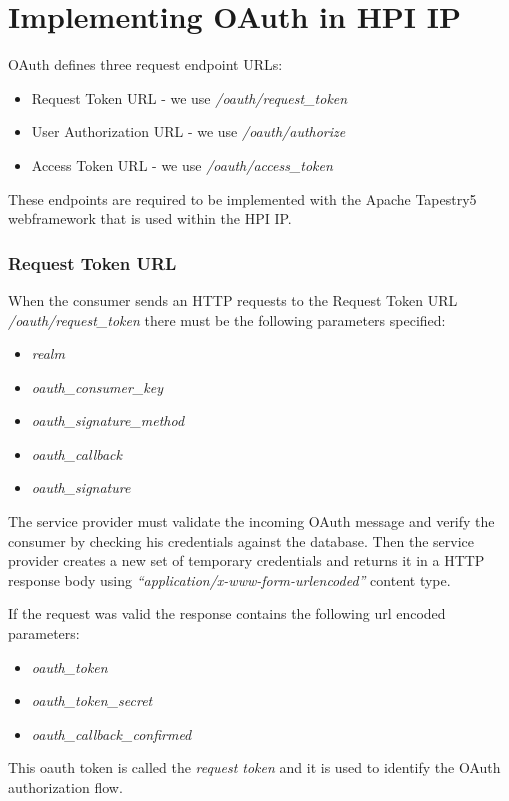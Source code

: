 \section{Implementing OAuth in HPI IP}

OAuth defines three request endpoint URLs:

\begin{itemize}
\item
  Request Token URL - we use \emph{/oauth/request\_token}
\item
  User Authorization URL - we use \emph{/oauth/authorize}
\item
  Access Token URL - we use \emph{/oauth/access\_token}
\end{itemize}
These endpoints are required to be implemented with the Apache
Tapestry5 webframework that is used within the HPI IP.

\subsubsection{Request Token URL}

When the consumer sends an HTTP requests to the Request Token URL
\emph{/oauth/request\_token} there must be the following parameters
specified:

\begin{itemize}
\item
  \emph{realm}
\item
  \emph{oauth\_consumer\_key}
\item
  \emph{oauth\_signature\_method}
\item
  \emph{oauth\_callback}
\item
  \emph{oauth\_signature}
\end{itemize}
The service provider must validate the incoming OAuth message and
verify the consumer by checking his credentials against the
database. Then the service provider creates a new set of temporary
credentials and returns it in a HTTP response body using
\emph{``application/x-www-form-urlencoded''} content type.

If the request was valid the response contains the following url
encoded parameters:

\begin{itemize}
\item
  \emph{oauth\_token}
\item
  \emph{oauth\_token\_secret}
\item
  \emph{oauth\_callback\_confirmed}
\end{itemize}
This oauth token is called the \emph{request token} and it is used
to identify the OAuth authorization flow.

